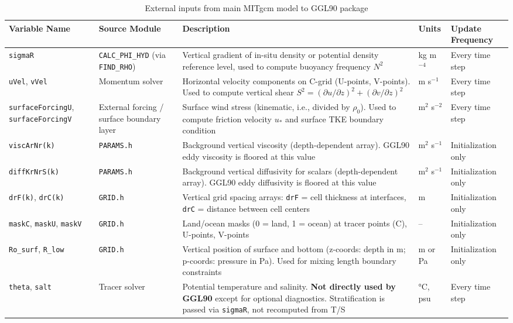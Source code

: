 \documentclass[12pt,letterpaper]{article}
\begin{document}
\begin{table}[ht]
\centering
\caption{External inputs from main MITgcm model to GGL90 package}
\label{tab:external_inputs}
\small
\begin{tabular}{p{3cm}p{3cm}p{5.5cm}lp{2.5cm}}
\toprule
\textbf{Variable Name} & \textbf{Source Module} & \textbf{Description} & \textbf{Units} & \textbf{Update Frequency} \\
\midrule
\verb|sigmaR| & \verb|CALC_PHI_HYD| (via \verb|FIND_RHO|) & Vertical gradient of in-situ density or potential density reference level, used to compute buoyancy frequency $N^2$ & kg m$^{-4}$ & Every time step \\
\addlinespace
\verb|uVel|, \verb|vVel| & Momentum solver & Horizontal velocity components on C-grid (U-points, V-points). Used to compute vertical shear $S^2 = (\partial u/\partial z)^2 + (\partial v/\partial z)^2$ & m s$^{-1}$ & Every time step \\
\addlinespace
\verb|surfaceForcingU|, \verb|surfaceForcingV| & External forcing / surface boundary layer & Surface wind stress (kinematic, i.e., divided by $\rho_0$). Used to compute friction velocity $u_*$ and surface TKE boundary condition & m$^2$ s$^{-2}$ & Every time step \\
\addlinespace
\verb|viscArNr(k)| & \verb|PARAMS.h| & Background vertical viscosity (depth-dependent array). GGL90 eddy viscosity is floored at this value & m$^2$ s$^{-1}$ & Initialization only \\
\addlinespace
\verb|diffKrNrS(k)| & \verb|PARAMS.h| & Background vertical diffusivity for scalars (depth-dependent array). GGL90 eddy diffusivity is floored at this value & m$^2$ s$^{-1}$ & Initialization only \\
\addlinespace
\verb|drF(k)|, \verb|drC(k)| & \verb|GRID.h| & Vertical grid spacing arrays: \verb|drF| = cell thickness at interfaces, \verb|drC| = distance between cell centers & m & Initialization only \\
\addlinespace
\verb|maskC|, \verb|maskU|, \verb|maskV| & \verb|GRID.h| & Land/ocean masks (0 = land, 1 = ocean) at tracer points (C), U-points, V-points & -- & Initialization only \\
\addlinespace
\verb|Ro_surf|, \verb|R_low| & \verb|GRID.h| & Vertical position of surface and bottom (z-coords: depth in m; p-coords: pressure in Pa). Used for mixing length boundary constraints & m or Pa & Initialization only \\
\addlinespace
\verb|theta|, \verb|salt| & Tracer solver & Potential temperature and salinity. \textbf{Not directly used by GGL90} except for optional diagnostics. Stratification is passed via \verb|sigmaR|, not recomputed from T/S & °C, psu & Every time step \\
\bottomrule
\end{tabular}
\end{table}
\end{document}
